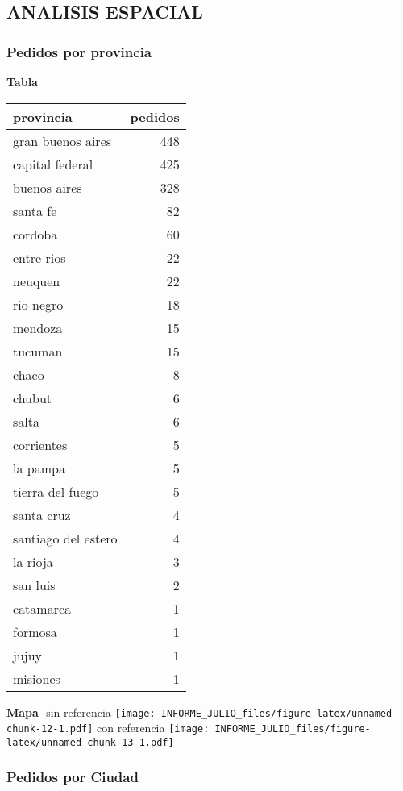 \documentclass[
]{article}
\begin{document}
\hypertarget{analisis-espacial}{%
\subsection{ANALISIS ESPACIAL}\label{analisis-espacial}}

\hypertarget{pedidos-por-provincia}{%
\subsubsection{Pedidos por provincia}\label{pedidos-por-provincia}}

\textbf{Tabla}

\begin{longtable}[t]{lr}
\toprule
provincia & pedidos\\
\midrule
gran buenos aires & 448\\
capital federal & 425\\
buenos aires & 328\\
santa fe & 82\\
cordoba & 60\\
\addlinespace
entre rios & 22\\
neuquen & 22\\
rio negro & 18\\
mendoza & 15\\
tucuman & 15\\
\addlinespace
chaco & 8\\
chubut & 6\\
salta & 6\\
corrientes & 5\\
la pampa & 5\\
\addlinespace
tierra del fuego & 5\\
santa cruz & 4\\
santiago del estero & 4\\
la rioja & 3\\
san luis & 2\\
\addlinespace
catamarca & 1\\
formosa & 1\\
jujuy & 1\\
misiones & 1\\
\bottomrule
\end{longtable}

\textbf{Mapa} -sin referencia
\texttt{[image: INFORME\_JULIO\_files/figure-latex/unnamed-chunk-12-1.pdf]}
con referencia
\texttt{[image: INFORME\_JULIO\_files/figure-latex/unnamed-chunk-13-1.pdf]}

\hypertarget{pedidos-por-ciudad}{%
\subsubsection{Pedidos por Ciudad}\label{pedidos-por-ciudad}}
\end{document}

